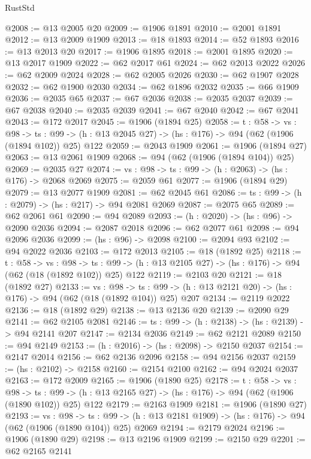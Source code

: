 \begin{lexlean}{RustStd}
\begin{coremodule}
{\begin{coremodule}
{{{{{{@2008 := @13 @2005 @20
@2009 := @1906 @1891
@2010 := @2001 @1891
@2012 := @13 @2009 @1909
@2013 := @18 @1893
@2014 := @52 @1893
@2016 := @13 @2013 @20
@2017 := @1906 @1895
@2018 := @2001 @1895
@2020 := @13 @2017 @1909
@2022 := @62 @2017 @61
@2024 := @62 @2013 @2022
@2026 := @62 @2009 @2024
@2028 := @62 @2005 @2026
@2030 := @62 @1907 @2028
@2032 := @62 @1900 @2030
@2034 := @62 @1896 @2032
@2035 := @66 @1909
@2036 := @2035 @65
@2037 := @67 @2036
@2038 := @2035 @2037
@2039 := @67 @2038
@2040 := @2035 @2039
@2041 := @67 @2040
@2042 := @67 @2041
@2043 := @172 @2017
@2045 := @1906 (@1894 @25)
@2058 := {t : @58} ->
  {vs : @98} ->
  {ts : @99} -> (h : @13 @2045 @27) -> (hs : @176) -> @94 (@62 (@1906 (@1894 @102)) @25) @122
@2059 := @2043 @1909
@2061 := @1906 (@1894 @27)
@2063 := @13 @2061 @1909
@2068 := @94 (@62 (@1906 (@1894 @104)) @25)
@2069 := @2035 @27
@2074 := {vs : @98} -> {ts : @99} -> (h : @2063) -> (hs : @176) -> @2068 @2069
@2075 := @2059 @61
@2077 := @1906 (@1894 @29)
@2079 := @13 @2077 @1909
@2081 := @62 @2045 @61
@2086 := {ts : @99} -> (h : @2079) -> (hs : @217) -> @94 @2081 @2069
@2087 := @2075 @65
@2089 := @62 @2061 @61
@2090 := @94 @2089
@2093 := (h : @2020) -> (hs : @96) -> @2090 @2036
@2094 := @2087 @2018
@2096 := @62 @2077 @61
@2098 := @94 @2096 @2036
@2099 := (hs : @96) -> @2098
@2100 := @2094 @93
@2102 := @94 @2022 @2036
@2103 := @172 @2013
@2105 := @18 (@1892 @25)
@2118 := {t : @58} ->
  {vs : @98} ->
  {ts : @99} -> (h : @13 @2105 @27) -> (hs : @176) -> @94 (@62 (@18 (@1892 @102)) @25) @122
@2119 := @2103 @20
@2121 := @18 (@1892 @27)
@2133 := {vs : @98} ->
  {ts : @99} -> (h : @13 @2121 @20) -> (hs : @176) -> @94 (@62 (@18 (@1892 @104)) @25) @207
@2134 := @2119 @2022
@2136 := @18 (@1892 @29)
@2138 := @13 @2136 @20
@2139 := @2090 @29
@2141 := @62 @2105 @2081
@2146 := {ts : @99} -> (h : @2138) -> (hs : @2139) -> @94 @2141 @207
@2147 := @2134 @2036
@2149 := @62 @2121 @2089
@2150 := @94 @2149
@2153 := (h : @2016) -> (hs : @2098) -> @2150 @2037
@2154 := @2147 @2014
@2156 := @62 @2136 @2096
@2158 := @94 @2156 @2037
@2159 := (hs : @2102) -> @2158
@2160 := @2154 @2100
@2162 := @94 @2024 @2037
@2163 := @172 @2009
@2165 := @1906 (@1890 @25)
@2178 := {t : @58} ->
  {vs : @98} ->
  {ts : @99} -> (h : @13 @2165 @27) -> (hs : @176) -> @94 (@62 (@1906 (@1890 @102)) @25) @122
@2179 := @2163 @1909
@2181 := @1906 (@1890 @27)
@2193 := {vs : @98} ->
  {ts : @99} -> (h : @13 @2181 @1909) -> (hs : @176) -> @94 (@62 (@1906 (@1890 @104)) @25) @2069
@2194 := @2179 @2024
@2196 := @1906 (@1890 @29)
@2198 := @13 @2196 @1909
@2199 := @2150 @29
@2201 := @62 @2165 @2141
}}}}}}
\end{coremodule}}
\end{coremodule}
\end{lexlean}
